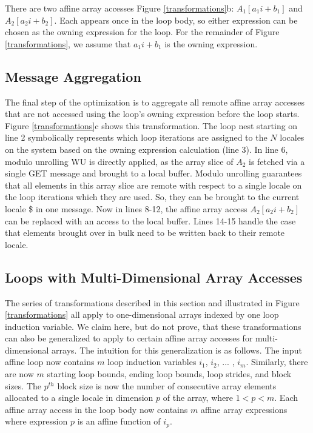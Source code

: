 There are two affine array accesses Figure \ref{transformations}b: $A_{1}[a_{1}i+b_{1}]$ and $A_{2}[a_{2}i+b_{2}]$. Each appears once in the loop body, so either expression can be chosen as the owning expression for the loop. For the remainder of Figure \ref{transformations}, we assume that $a_{1}i+b_{1}$ is the owning expression. 

\subsection{Message Aggregation}\label{subsec:message_aggregation}

The final step of the optimization is to aggregate all remote affine array accesses that are not accessed using the loop's owning expression before the loop starts. Figure \ref{transformations}c shows this transformation. The loop nest starting on line 2 symbolically represents which loop iterations are assigned to the $N$ locales on the system based on the owning expression calculation (line 3). In line 6, modulo unrolling WU is directly applied, as the array slice of $A_{2}$ is fetched via a single GET message and brought to a local buffer. Modulo unrolling guarantees that all elements in this array slice are remote with respect to a single locale on the loop iterations which they are used. So, they can be brought to the current locale \$ in one message. Now in lines 8-12, the affine array access $A_{2}[a_{2}i+b_{2}]$ can be replaced with an access to the local buffer. Lines 14-15 handle the case that elements brought over in bulk need to be written back to their remote locale. 

\subsection{Loops with Multi-Dimensional Array Accesses}\label{subsec:multi_dimensional}

The series of transformations described in this section and illustrated in Figure \ref{transformations} all apply to one-dimensional arrays indexed by one loop induction variable. We claim here, but do not prove, that these transformations can also be generalized to apply to certain affine array accesses for multi-dimensional arrays. The intuition for this generalization is as follows. The input affine loop now contains $m$ loop induction variables $i_{1}$, $i_{2}$, ... , $i_{m}$. Similarly, there are now $m$ starting loop bounds, ending loop bounds, loop strides, and block sizes. The $p^{th}$ block size is now the number of consecutive array elements allocated to a single locale in dimension $p$ of the array, where $1 < p < m$. Each affine array access in the loop body now contains $m$ affine array expressions where expression $p$ is an affine function of $i_{p}$. 

